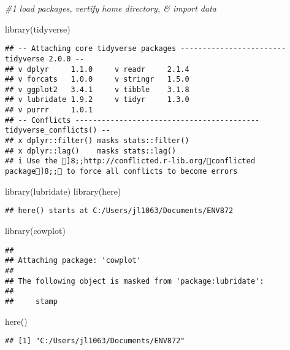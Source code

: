 \documentclass[
]{article}
\newenvironment{Shaded}{\begin{snugshade}}{\end{snugshade}}
\newcommand{\CommentTok}[1]{\textcolor[rgb]{0.56,0.35,0.01}{\textit{#1}}}
\newcommand{\FunctionTok}[1]{\textcolor[rgb]{0.00,0.00,0.00}{#1}}
\newcommand{\NormalTok}[1]{#1}
\begin{document}
\begin{Shaded}
\begin{Highlighting}[]
\CommentTok{\#1 load packages, vertify home directory, \& import data}

\FunctionTok{library}\NormalTok{(tidyverse)}
\end{Highlighting}
\end{Shaded}

\begin{verbatim}
## -- Attaching core tidyverse packages ------------------------ tidyverse 2.0.0 --
## v dplyr     1.1.0     v readr     2.1.4
## v forcats   1.0.0     v stringr   1.5.0
## v ggplot2   3.4.1     v tibble    3.1.8
## v lubridate 1.9.2     v tidyr     1.3.0
## v purrr     1.0.1     
## -- Conflicts ------------------------------------------ tidyverse_conflicts() --
## x dplyr::filter() masks stats::filter()
## x dplyr::lag()    masks stats::lag()
## i Use the ]8;;http://conflicted.r-lib.org/conflicted package]8;; to force all conflicts to become errors
\end{verbatim}

\begin{Shaded}
\begin{Highlighting}[]
\FunctionTok{library}\NormalTok{(lubridate)}
\FunctionTok{library}\NormalTok{(here)}
\end{Highlighting}
\end{Shaded}

\begin{verbatim}
## here() starts at C:/Users/jl1063/Documents/ENV872
\end{verbatim}

\begin{Shaded}
\begin{Highlighting}[]
\FunctionTok{library}\NormalTok{(cowplot)}
\end{Highlighting}
\end{Shaded}

\begin{verbatim}
## 
## Attaching package: 'cowplot'
## 
## The following object is masked from 'package:lubridate':
## 
##     stamp
\end{verbatim}

\begin{Shaded}
\begin{Highlighting}[]
\FunctionTok{here}\NormalTok{()}
\end{Highlighting}
\end{Shaded}

\begin{verbatim}
## [1] "C:/Users/jl1063/Documents/ENV872"
\end{verbatim}
\end{document}
